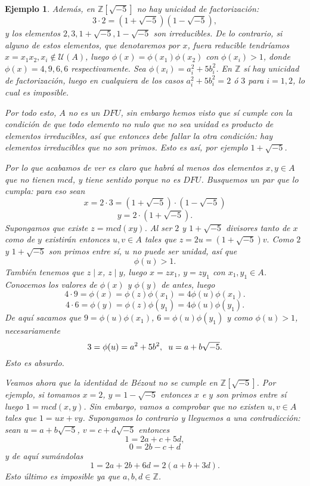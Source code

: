 \documentclass[12pt]{article}
\newtheorem{example}{Ejemplo}[theorem]
\begin{document}
\begin{example}
Además, en $\mathbb{Z}[\sqrt{-5}]$ no hay unicidad de factorización: $$3 \cdot 2 = (1 + \sqrt{-5}) (1- \sqrt{-5}),$$ y los elementos $2,3, 1+ \sqrt{-5}, 1 - \sqrt{-5}$ son irreducibles. De lo contrario, si alguno de estos elementos, que denotaremos por $x$, fuera reducible tendríamos $x = x_{1}x_{2},  x_{i} \notin \mathcal{U}(A)$, luego $\phi(x) = \phi(x_{1}) \phi(x_{2})$ con $\phi(x_{i}) >1$, donde $\phi(x) = 4,9,6,6$ respectivamente. Sea $\phi(x_{i}) = a_{i}^{2} + 5b_{i}^{2}$. En $\mathbb{Z}$ sí hay unicidad de factorización, luego en cualquiera de los casos $a_{i}^{2}+5b_{i}^{2} = 2$ ó $3$ para $i = 1,2$, lo cual es imposible.

Por todo esto, $A$ no es un $DFU$, sin embargo hemos visto que sí cumple con la condición de que todo elemento no nulo que no sea unidad es producto de elementos irreducibles, así que entonces debe fallar la otra condición: hay elementos irreducibles que no son primos. Esto es así, por ejemplo $1+\sqrt{-5}$.

Por lo que acabamos de ver es claro que habrá al menos dos elementos $x,y \in A$ que no tienen $mcd$, y tiene sentido porque no es $DFU$. Busquemos un par que lo cumpla: para eso sean $$x = 2 \cdot 3 = (1 + \sqrt{-5})\cdot(1- \sqrt{-5})$$ $$y = 2 \cdot (1 + \sqrt{-5}).$$ Supongamos que existe $z = mcd(xy)$. Al ser $2$ y $1 + \sqrt{-5}$ divisores tanto de $x$ como de $y$ existirán entonces $u,v \in A$ tales que $z = 2u = (1 + \sqrt{-5})v.$ Como $2$ y $1+ \sqrt{-5}$ son primos entre sí, $u$ no puede ser unidad, así que $$\phi(u) > 1.$$ También tenemos que $z \mid x$, $z \mid y$, luego $x = zx_{1}$, $y = zy_{1}$ con $x_{1}, y_{1} \in A$. Conocemos los valores de $\phi(x)$ y $\phi(y)$ de antes, luego $$4 \cdot 9 = \phi(x) = \phi(z) \phi (x_{1}) = 4\phi(u) \phi(x_{1}).$$ $$4 \cdot 6 = \phi(y) = \phi(z) \phi(y_{1}) = 4 \phi(u) \phi(y_{1}).$$ De aquí sacamos que $9 = \phi(u) \phi(x_{1})$, $ 6 = \phi(u) \phi(y_{1})$ y como $\phi(u) >1$, necesariamente $$3 = \phi(u) = a^{2} + 5b^{2}, \hspace{0.2cm} u = a+b\sqrt{-5}.$$ Esto es absurdo.

Veamos ahora que la identidad de Bézout no se cumple en $\mathbb{Z}[\sqrt{-5}]$. Por ejemplo, si tomamos $x = 2$, $y = 1-\sqrt{-5}$ entonces $x$ e $y$ son primos entre sí luego $1 = mcd(x,y)$. Sin embargo, vamos a comprobar que no existen $u,v \in A$ tales que $1 = ux + vy$. Supongamos lo contrario y lleguemos a una contradicción: sean $u = a+b\sqrt{-5}$, $v = c + d\sqrt{-5}$ entonces $$1 = 2a + c+ 5d,$$ $$0 = 2b - c + d$$ y de aquí sumándolas $$1 = 2a + 2b + 6d = 2(a + b + 3d).$$ Esto último es imposible ya que $a,b,d \in \mathbb{Z}$.


\end{example}
\end{document}
